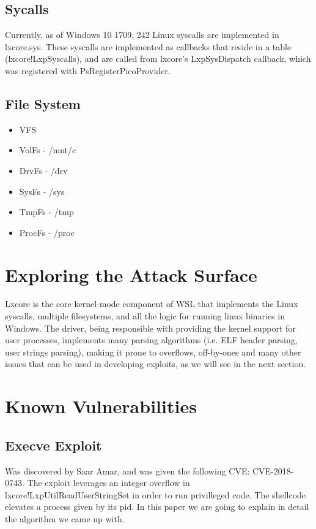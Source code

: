 \documentclass[conference]{IEEEtran}
\begin{document}
\subsection{Sycalls}

    Currently, as of Windows 10 1709, 242 Linux syscalls are implemented in lxcore.sys. These syscalls are implemented as callbacks that reside
    in a table (lxcore!LxpSyscalls), and are called from lxcore's LxpSysDispatch callback, which was registered with PsRegisterPicoProvider.\\

\subsection{File System}

\begin{itemize}
    \item VFS
    \item VolFs - /mnt/c
    \item DrvFs - /drv
    \item SysFs - /sys
    \item TmpFs - /tmp 
    \item ProcFs - /proc
\end{itemize}



\section{Exploring the Attack Surface}
    Lxcore is the core kernel-mode component of WSL that implements the Linux syscalls, multiple filesystems, and all the logic for running
    linux binaries in Windows. The driver, being responsible with providing the kernel support for user processes, implements many parsing
    algorithms (i.e. ELF header parsing, user strings parsing), making it prone to overflows, off-by-ones and many other issues that can be
    used in developing exploits, as we will see in the next section.\\

\section{Known Vulnerabilities}

    \subsection{Execve Exploit}
    Was discovered by Saar Amar, and was given the following CVE: CVE-2018-0743. The exploit leverages an integer overflow in
    lxcore!LxpUtilReadUserStringSet in order to run privilleged code. The shellcode elevates a process given by its pid. In this paper we are going
    to explain in detail the algorithm we came up with.\\
\end{document}
